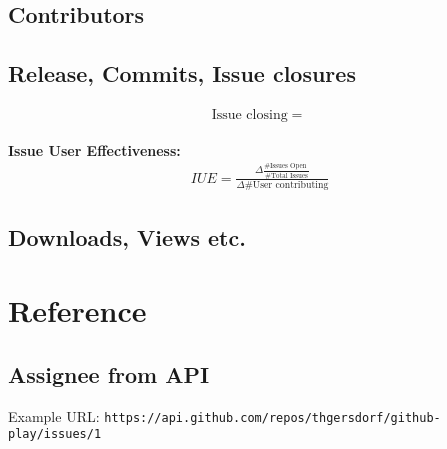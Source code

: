 \documentclass[a4paper,10pt]{article}
\begin{document}
\subsection{Contributors}
\subsection{Release, Commits, Issue closures}

\begin{align}
 \text{Issue closing} = \frac{}{}
\end{align}


\textbf{Issue User Effectiveness:} 
\begin{align}
 IUE = \frac{\Delta \frac{\text{\# Issues Open }}{\text{\# Total Issues}}}{\Delta\text{\# User contributing}}
\end{align}



\subsection{Downloads, Views etc.}


\section{Reference}
\subsection{Assignee from API}
Example URL: \texttt{https://api.github.com/repos/thgersdorf/github-play/issues/1}
\end{document}
